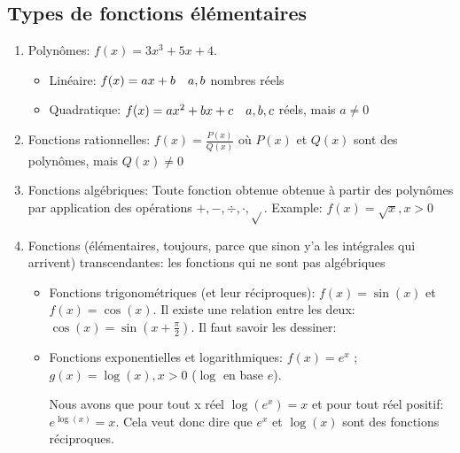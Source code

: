 \documentclass{article}
\begin{document}
\subsection{Types de fonctions élémentaires}
\begin{enumerate}[left=0pt]
    \item Polynômes: $f\left(x\right) = 3x^3 + 5x + 4$. 
        \begin{itemize}
            \item Linéaire: $f\left(x\right) = ax + b \mathspace a,b$ nombres réels
            \item Quadratique: $f\left(x\right) = ax^2 + bx + c \mathspace a,b,c$ réels, mais $a\neq 0$
        \end{itemize}
    \item Fonctions rationnelles: $f\left(x\right) = \frac{P\left(x\right)}{Q\left(x\right)}$ où $P\left(x\right)$ et $Q\left(x\right)$ sont des polynômes, mais $Q\left(x\right) \neq 0$
    \item Fonctions algébriques: Toute fonction obtenue obtenue à partir des polynômes par application des opérations $+, -, \div, \cdot, \sqrt{}$.
    Example: $f\left(x\right) = \sqrt{x}, x > 0$ 
\item Fonctions (élémentaires, toujours, parce que sinon y'a les intégrales qui arrivent) transcendantes: les fonctions qui ne sont pas algébriques
        \begin{itemize}
            \item Fonctions trigonométriques (et leur réciproques): $f\left(x\right) = \sin\left(x\right)$ et $f\left(x\right) = \cos\left(x\right)$. Il existe une relation entre les deux: $\cos\left(x\right) = \sin\left(x + \frac{\pi}{2}\right)$. Il faut savoir les dessiner:

            \item Fonctions exponentielles et logarithmiques: $f\left(x\right) = e^x$ ; $g\left(x\right) = \log\left(x\right), x > 0$ ($\log$ en base $e$). 

                Nous avons que pour tout x réel $\log\left(e^x\right) = x$ et pour tout réel positif: $e^{\log\left(x\right)} = x$. Cela veut donc dire que $e^x$ et $\log\left(x\right)$ sont des fonctions réciproques. 
        \end{itemize}
\end{enumerate}

\begin{parag}{}
\end{parag}
 
\end{document}
